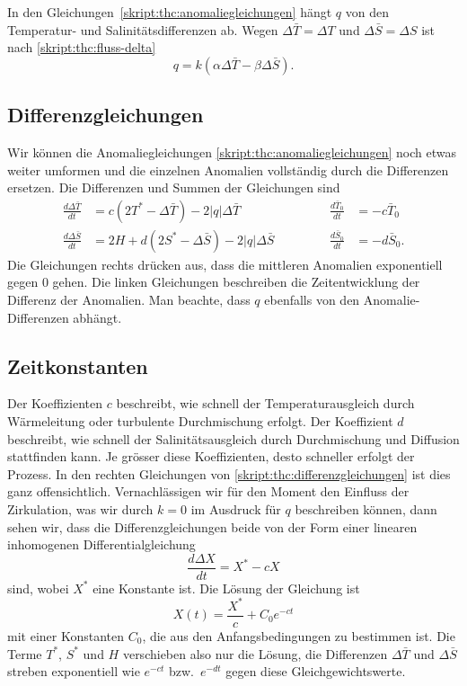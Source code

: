 In den Gleichungen~\eqref{skript:thc:anomaliegleichungen} hängt
$q$ von den Temperatur- und Salinitätsdifferenzen ab.
Wegen $\Delta\bar T=\Delta T$ und $\Delta\bar S=\Delta S$ ist nach
\eqref{skript:thc:fluss-delta}
\begin{equation}
q = k(\alpha\Delta\bar T-\beta \Delta\bar S).
\label{skript:thc:fluss-delta-anomalie}
\end{equation}

\subsection{Differenzgleichungen}
Wir können die Anomaliegleichungen \eqref{skript:thc:anomaliegleichungen}
noch etwas weiter umformen und die einzelnen Ano\-malien vollständig durch
die Differenzen ersetzen.
Die Differenzen und Summen der Gleichungen sind
\begin{equation}
\begin{aligned}
\frac{d\Delta\bar T}{dt}
&=
c(2T^*-\Delta\bar T)-2|q|\Delta\bar T
&&\qquad&
\frac{d\bar T_0}{dt}
&=
-c\bar T_0
\\
\frac{d\Delta\bar S}{dt}
&=
2H+d(2S^*-\Delta\bar S) - 2|q|\Delta\bar S
&&\qquad&
\frac{d\bar S_0}{dt}
&=
-d\bar S_0.
\end{aligned}
\label{skript:thc:differenzgleichungen}
\end{equation}
Die Gleichungen rechts drücken aus, dass die mittleren Anomalien
exponentiell gegen $0$ gehen.
Die linken Gleichungen beschreiben die Zeitentwicklung der Differenz
der Anomalien.
Man beachte, dass $q$ ebenfalls von den Anomalie-Differenzen abhängt.

\subsection{Zeitkonstanten\label{section:zeitkonstanten}}
\label{skript:thc:zeitkonstanten}
Der Koeffizienten $c$ beschreibt, wie schnell der Temperaturausgleich
durch Wärmeleitung oder turbulente Durchmischung erfolgt.
Der Koeffizient $d$ beschreibt, wie schnell der Salinitätsausgleich
durch Durchmischung und Diffusion stattfinden kann.
Je grösser diese Koeffizienten, desto schneller erfolgt der Prozess.
In den rechten Gleichungen von \eqref{skript:thc:differenzgleichungen}
ist dies ganz offensichtlich.
Vernachlässigen wir für den Moment den Einfluss der Zirkulation,
was wir durch $k=0$ im Ausdruck für $q$ beschreiben können, dann
sehen wir, dass die Differenzgleichungen beide von der Form
einer linearen inhomogenen Differentialgleichung
\[
\frac{d\Delta X}{dt}
=
X^* -cX
\]
sind, wobei $X^*$ eine Konstante ist.
Die Lösung der Gleichung ist
\[
X(t) = \frac{X^*}{c} + C_0 e^{-ct}
\]
mit einer Konstanten $C_0$, die aus den Anfangsbedingungen zu
bestimmen ist.
Die Terme $T^*$, $S^*$ und $H$ verschieben also nur die Lösung,
die Differenzen $\Delta\bar T$ und $\Delta\bar S$ streben exponentiell
wie $e^{-ct}$ bzw.~$e^{-dt}$ gegen diese Gleichgewichtswerte.

